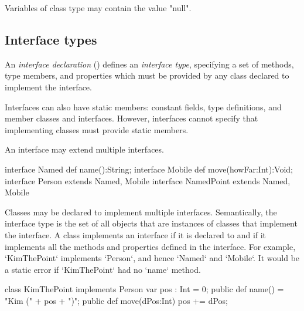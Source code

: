 {


Variables of class type may contain the value \xcd"null". 

\subsection{Interface types}
\label{InterfaceTypes}


An {\em interface declaration} () defines an {\em
interface type}, specifying a set of methods, type members, and
properties which must be provided by any class declared to implement the
interface. 


Interfaces can also have static members: constant fields, type definitions,
and member classes and interfaces.  However, interfaces cannot specify that
implementing classes must provide static members.

An interface may extend multiple interfaces.  
\begin{xten}
interface Named {
  def name():String;
}
interface Mobile {
  def move(howFar:Int):Void;
}
interface Person extends Named, Mobile {}
interface NamedPoint extends Named, Mobile{} 
\end{xten}
%


Classes may be declared to implement multiple interfaces.
Semantically, the interface type is the set of all objects that are
instances of classes that implement the interface. A class implements
an interface if it is declared to and if it implements all the methods
and properties defined in the interface.  For example, \xcd`KimThePoint`
implements \xcd`Person`, and hence \xcd`Named` and \xcd`Mobile`.  It would be
a static error if \xcd`KimThePoint` had no \xcd`name` method.

\begin{xten}
class KimThePoint implements Person {
   var pos : Int = 0;
   public def name() = "Kim (" + pos + ")";
   public def move(dPos:Int) { pos += dPos; }
}
\end{xten}
%


}
